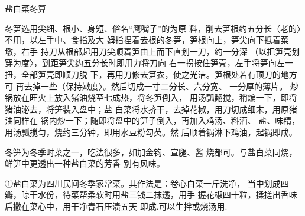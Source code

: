\begin{recipe}{盐白菜冬算}

\ingredients


\cooking

\step 冬笋选用尖细、根小、身短、俗名“鹰嘴子”的为原 料，削去笋根约五分长（老的〉不用，以左手中、食指及大 姆指捏着去根的冬笋，笋根向上，笋尖向下抵着菜墩，右手 持刀从根部起用刀尖顺着笋由上而下直划一刀，约一分深 （以把笋壳划穿为度〉，到距笋尖约五分长时即用力将刀向
右一拐按住笋壳，左手将笋向左一扭，全部笋壳即顺刀脱 下，再用刀修去笋衣，使之光洁。笋根处若有顶刀的地方可 再去掉一些（保持嫩度〉。然后切成一寸二分长、六分宽、 一分厚的薄片。
\step 炒锅放在旺火上放入猪油烧至七成热，将冬笋倒入， 用汤瓢翻搅，稍煸一下，即将猪油泌去，将笋装入盘中；盐 白菜将水挤干，去掉花椒，用刀切成细末，用原猪油同样在 锅内炒一下；随即将盘中的笋子倒入，再加入鸡汤、料酒、 盐、味精，用汤瓢搅匀，烧约三分钟，即用水豆粉勾芡。然 后顺着锅淋下鸡油，起锅即成。

\notes

冬笋为冬季时菜之一，吃法很多，如加金钩、宣腿、酱 烧都可。与盐白菜同烧，鲜笋中更透出一种盐白菜的芳香 别有风味。

①盐白菜为四川民间冬季家常菜。其作法是：卷心白菜一斤洗净， 当中划成四瓣，晾干水份，待菜帮柔软时用盐三钱二抹透，用手 握花椒四十粒，揉搓出香味后撒在菜心中，用干净青石压渍五天 即成.可以生拌或烧汤用.

\end{recipe}


